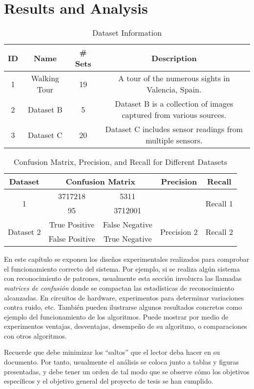\chapter{Results and Analysis}
\label{chp:results}

\begin{table}[htbp]
  \centering
  \begin{tabular}{|c|c|c|c|}
    \hline
    \textbf{ID} & \textbf{Name} & \textbf{\# Sets} & \textbf{Description} \\
    \hline
    1 & Walking Tour & 19 & A tour of the numerous sights in Valencia, Spain. \\
    \hline
    2 & Dataset B & 5 & Dataset B is a collection of images captured from various sources. \\
    \hline
    3 & Dataset C & 20 & Dataset C includes sensor readings from multiple sensors. \\
    \hline
  \end{tabular}
  \caption{Dataset Information}
  \label{tab:dataset-info}
\end{table}

\begin{table}[htbp]
  \centering
  \begin{tabular}{|c|c|c|c|c|}
    \hline
    \textbf{Dataset} & \multicolumn{2}{c|}{\textbf{Confusion Matrix}} & \textbf{Precision} & \textbf{Recall} \\
    \hline
    \multirow{2}{*}{1}           & 3717218 & 5311 &
    \multirow{2}{*}{} &
    \multirow{2}{*}{Recall 1}   \\
    \cline{2-3}                  &      95 & 3712001 & & \\
    \hline
    \multirow{2}{*}{Dataset 2} & True Positive & False Negative &
    \multirow{2}{*}{Precision 2} &
    \multirow{2}{*}{Recall 2} \\
    \cline{2-3}                & False Positive & True Negative & & \\
    \hline
  \end{tabular}
  \caption{Confusion Matrix, Precision, and Recall for Different Datasets}
  \label{tab:confusion-matrix}
\end{table}

En este capítulo se exponen los diseños experimentales realizados para
comprobar el funcionamiento correcto del sistema. Por ejemplo, si se
realiza algún sistema con reconocimiento de patrones, usualmente esta
sección involucra las llamadas \emph{matrices de confusión} donde se
compactan las estadísticas de reconocimiento alcanzadas. En circuitos
de hardware, experimentos para determinar variaciones contra ruido,
etc. También pueden ilustrarse algunos resultados concretos como
ejemplo del funcionamiento de los algoritmos. Puede mostrar por medio
de experimentos ventajas, desventajas, desempeño de su algoritmo, o
comparaciones con otros algoritmos.

Recuerde que debe minimizar los ``saltos'' que el lector deba hacer en
su documento. Por tanto, usualmente el análisis se coloca junto a
tablas y figuras presentadas, y debe tener un orden de tal modo que se
observe cómo los objetivos específicos y el objetivo general del
proyecto de tesis se han cumplido.
